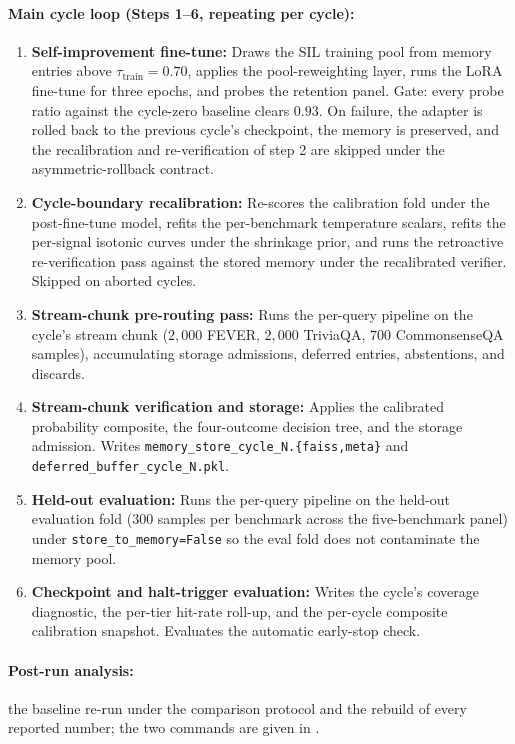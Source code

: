 \paragraph{Main cycle loop (Steps 1--6, repeating per cycle):}
\begin{enumerate}
\item \textbf{Self-improvement fine-tune:} Draws the SIL training pool from memory entries above $\tau_{\text{train}} = 0.70$, applies the pool-reweighting layer, runs the LoRA fine-tune for three epochs, and probes the retention panel. Gate: every probe ratio against the cycle-zero baseline clears $0.93$. On failure, the adapter is rolled back to the previous cycle's checkpoint, the memory is preserved, and the recalibration and re-verification of step 2 are skipped under the asymmetric-rollback contract.
\item \textbf{Cycle-boundary recalibration:} Re-scores the calibration fold under the post-fine-tune model, refits the per-benchmark temperature scalars, refits the per-signal isotonic curves under the shrinkage prior, and runs the retroactive re-verification pass against the stored memory under the recalibrated verifier. Skipped on aborted cycles.
\item \textbf{Stream-chunk pre-routing pass:} Runs the per-query pipeline on the cycle's stream chunk ($2{,}000$ FEVER, $2{,}000$ TriviaQA, $700$ CommonsenseQA samples), accumulating storage admissions, deferred entries, abstentions, and discards.
\item \textbf{Stream-chunk verification and storage:} Applies the calibrated probability composite, the four-outcome decision tree, and the storage admission. Writes \verb|memory_store_cycle_N.{faiss,meta}| and \verb|deferred_buffer_cycle_N.pkl|.
\item \textbf{Held-out evaluation:} Runs the per-query pipeline on the held-out evaluation fold ($300$ samples per benchmark across the five-benchmark panel) under \verb|store_to_memory=False| so the eval fold does not contaminate the memory pool.
\item \textbf{Checkpoint and halt-trigger evaluation:} Writes the cycle's coverage diagnostic, the per-tier hit-rate roll-up, and the per-cycle composite calibration snapshot. Evaluates the automatic early-stop check.
\end{enumerate}

\paragraph{Post-run analysis:} the baseline re-run under the comparison protocol and the rebuild of every reported number; the two commands are given in .

